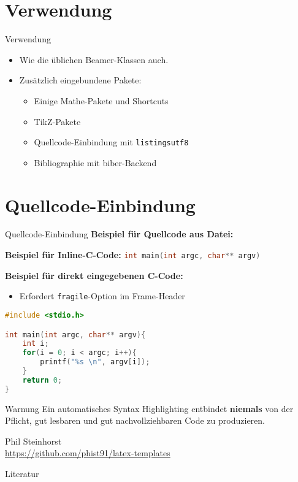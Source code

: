 \documentclass[10pt,
	wide,
	xcolor={x11names},
	hyperref={colorlinks=false},
	pantone312]{beamer}		%
\begin{document}
\section{Verwendung}
\begin{frame}[t]{Verwendung}
	\begin{itemize}[<+->]
		\item Wie die üblichen Beamer-Klassen auch.
		\item Zusätzlich eingebundene Pakete:
		\begin{itemize}
			\item Einige Mathe-Pakete und Shortcuts
			\item TikZ-Pakete
			\item Quellcode-Einbindung mit \texttt{listingsutf8}
			\minoritem {}
			\item Bibliographie mit biber-Backend \cite{biblatex-ctan}
		\end{itemize}
	\end{itemize}
\end{frame}

\section{Quellcode-Einbindung}
\begin{frame}[t]{Quellcode-Einbindung}
	\textbf{Beispiel für Quellcode aus Datei:}
	
	
	\textbf{Beispiel für Inline-C-Code:} \lstinline[language=c]|int main(int argc, char** argv)|
\end{frame}

\begin{frame}[t,fragile]{}
\textbf{Beispiel für direkt eingegebenen C-Code:}
\begin{itemize}
	\item Erfordert \texttt{fragile}-Option im Frame-Header
\end{itemize}

\begin{lstlisting}[language=c]
#include <stdio.h>

int main(int argc, char** argv){
	int i;
	for(i = 0; i < argc; i++){
		printf("%s \n", argv[i]);
	}
	return 0;
}
\end{lstlisting}
\end{frame}

\begin{frame}[c]{}
	\begin{alertblock}{Warnung}
		Ein automatisches Syntax Highlighting entbindet \textbf{niemals} von der Pflicht, gut lesbaren und gut nachvollziehbaren Code zu produzieren.
	\end{alertblock}
	
	\pause
	
	\begin{flushright}
	Phil Steinhorst \\
	\url{https://github.com/phist91/latex-templates}
	\end{flushright}
\end{frame}

\begin{frame}[c]{Literatur}
	\printbibliography
\end{frame}
\end{document}
